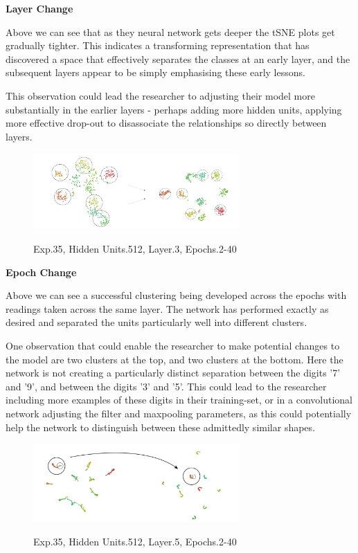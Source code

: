 \documentclass[a4paper,11pt,titlepage]{article}
\begin{document}
	\textbf{Layer Change}
	\par
	Above we can see that as they neural network gets deeper the tSNE plots get gradually tighter. This indicates a transforming representation that has discovered a space that effectively separates the classes at an early layer, and the subsequent layers appear to be simply emphasising these early lessons.
	\par 
	This observation could lead the researcher to adjusting their model more substantially in the earlier layers - perhaps adding more hidden units, applying more effective drop-out to disassociate the relationships so directly between layers.

	\begin{figure}[H]
    			\centering	
			{{\includegraphics[width=0.7\textwidth]
    				{img/conc_X35_H512_L3_E2-40.png} 
    			}}%
    			\caption{Exp.35, Hidden Units.512, Layer.3, Epochs.2-40}%
    		\label{fig:mnistHinton}
	\end{figure}
	
	\textbf{Epoch Change}
	\par 
	Above we can see a successful clustering being developed across the epochs with readings taken across the same layer. The network has performed exactly as desired and separated the units particularly well into different clusters.
	\par 
	One observation that could enable the researcher to make potential changes to the model are two clusters at the top, and two clusters at the bottom. Here the network is not creating a particularly distinct separation between the digits '7' and '9', and between the digits '3' and '5'. This could lead to the researcher including more examples of these digits in their training-set, or in a convolutional network adjusting the filter and maxpooling parameters, as this could potentially help the network to distinguish between these admittedly similar shapes.

	\begin{figure}[H]
    			\centering	
			{{\includegraphics[width=0.7\textwidth]
    				{img/conc_X35_H512_L5_E2-40.png} 
    			}}%
    			\caption{Exp.35, Hidden Units.512, Layer.5, Epochs.2-40}%
    		\label{fig:mnistHinton}
	\end{figure}
	
\end{document}
